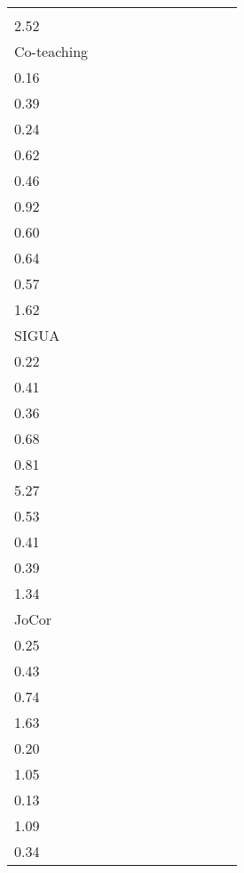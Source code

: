 \documentclass[11pt]{article}
\begin{document}
\begin{table}[!htbp]
\begin{tabular}{l |cc|cc|cc|cc|cc}
			& \makecell{68.17\\ \scriptsize{2.52}}
			\\
			\hline
			Co-teaching & \makecell{82.35\\ \scriptsize{0.16}} 
			& \makecell{77.96\\ \scriptsize{0.39}}
			& \makecell{83.87\\ \scriptsize{0.24}}
			& \makecell{73.43\\ \scriptsize{0.62}}
			& \makecell{80.94\\ \scriptsize{0.46}}
			& \makecell{72.81\\ \scriptsize{0.92}}
			& \makecell{81.17\\ \scriptsize{0.60}}
			& \textbf{\makecell{74.37\\ \scriptsize{0.64}}}
			& \makecell{79.92\\ \scriptsize{0.57}}
			&\makecell{73.29\\ \scriptsize{1.62}}\\
			\hline	
			SIGUA & \makecell{78.19\\ \scriptsize{0.22}} 
			& \makecell{77.67\\ \scriptsize{0.41}}
			& \makecell{75.14\\ \scriptsize{0.36}}
			& \makecell{52.76\\ \scriptsize{0.68}}
			& \makecell{74.41\\ \scriptsize{0.81}}
			& \makecell{61.91\\ \scriptsize{5.27}}
			& \makecell{75.75\\ \scriptsize{0.53}}
			& \makecell{74.05\\ \scriptsize{0.41}}
			& \makecell{74.34\\ \scriptsize{0.39}}
			& \makecell{67.98\\ \scriptsize{1.34}}\\
			\hline	
			JoCor& \makecell{80.96\\ \scriptsize{0.25}}
		    & \makecell{76.65\\ \scriptsize{0.43}}
		    & \makecell{81.39\\ \scriptsize{0.74}}
		    & \makecell{69.92\\ \scriptsize{1.63}}
		    & \makecell{80.33\\ \scriptsize{0.20}}
		    & \makecell{71.62\\ \scriptsize{1.05}}
		    & \makecell{79.03\\ \scriptsize{0.13}}
		    & \makecell{74.33\\ \scriptsize{1.09}}
		    & \makecell{78.21\\ \scriptsize{0.34}}

\end{tabular}
\end{table}
\end{document}

